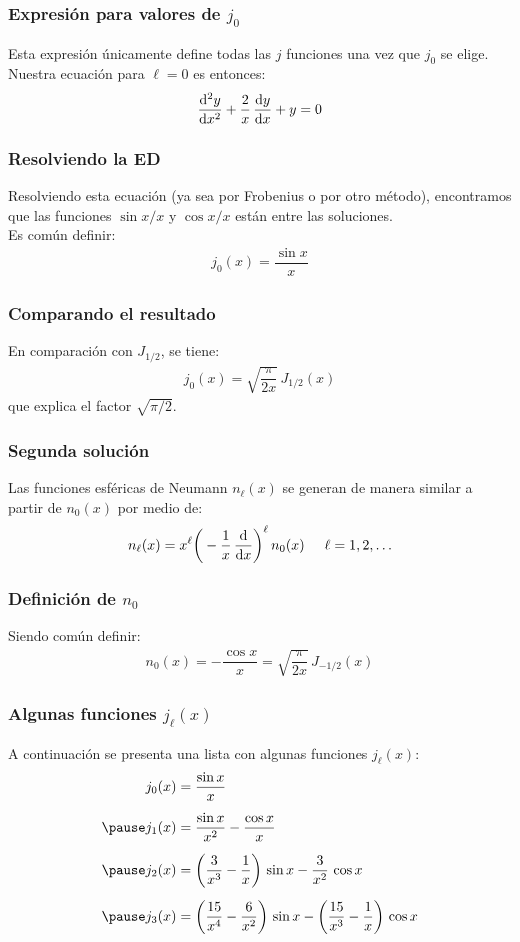\documentclass[12pt]{beamer}
\begin{document}
\begin{frame}
\frametitle{Expresión para valores de $j_{0}$}
Esta expresión únicamente define todas las $j$ funciones una vez que $j_{0}$ se elige. Nuestra ecuación para $\ell = 0$ es entonces:
\pause
\begin{align*}
\dv[2]{y}{x} + \dfrac{2}{x} \, \dv{y}{x} + y = 0
\end{align*}
\end{frame}
\begin{frame}
\frametitle{Resolviendo la ED}
Resolviendo esta ecuación (ya sea por Frobenius o por otro método), \pause encontramos que las funciones $\sin x /x$ y $\cos x /x$ están entre las soluciones.
\\
\bigskip
\pause
Es común definir:
\pause
\begin{align*}
j_{0} (x) = \dfrac{\sin x}{x}
\end{align*}
\end{frame}
\begin{frame}
\frametitle{Comparando el resultado}
En comparación con $J_{1/2}$, se tiene:
\pause
\begin{align*}
j_{0} (x) = \sqrt{\dfrac{\pi}{2 x}} \, J_{1/2} (x)
\end{align*}
que explica el factor $\sqrt{\pi / 2}$.
\end{frame}
\begin{frame}
\frametitle{Segunda  solución}
Las funciones esféricas de Neumann $n_{\ell} (x)$ se generan de manera similar a partir de $n_{0} (x)$ por medio de:
\pause
\begin{align*}
n_{\ell} (x) = x^{\ell} \bigg( - \dfrac{1}{x} \, \dv{x} \bigg)^{\ell} \, n_{0} (x) \hspace{0.5cm} \ell = 1, 2, \ldots
\end{align*}
\end{frame}
\begin{frame}
\frametitle{Definición de $n_{0}$}
Siendo común definir:
\pause
\begin{align*}
n_{0} (x) = - \dfrac{\cos x}{x} = \sqrt{\dfrac{\pi}{2 x}} \, J_{-1/2} (x)
\end{align*}
\end{frame}
\begin{frame}
\frametitle{Algunas funciones $j_{\ell} (x)$}
A continuación se presenta una lista con algunas funciones $j_{\ell} (x)$:
\pause
\begin{eqnarray*}
\begin{aligned}
j_{0} (x) &= \dfrac{\sin x}{x} \\[0.5em] \pause
j_{1} (x) &= \dfrac{\sin x}{x^{2}} - \dfrac{\cos x}{x} \\[0.5em] \pause
j_{2} (x) &= \bigg( \dfrac{3}{x^{3}} - \dfrac{1}{x} \bigg) \, \sin x - \dfrac{3}{x^{2}} \, \cos x \\[0.5em] \pause
j_{3} (x) &= \bigg( \dfrac{15}{x^{4}} - \dfrac{6}{x^{2}} \bigg) \, \sin x - \bigg( \dfrac{15}{x^{3}} - \dfrac{1}{x} \bigg) \, \cos x 
\end{aligned}
\end{eqnarray*}
\end{frame}
\end{document}
